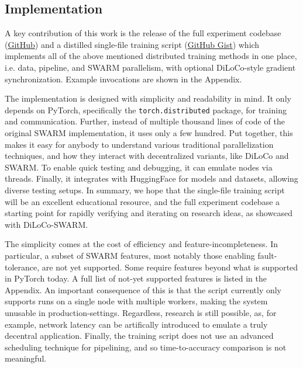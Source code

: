 \documentclass{article}
\newcommand{\github}{\href{https://github.com/mikasenghaas/diloco-swarm}{GitHub}}
\newcommand{\gist}{\href{https://gist.github.com/mikasenghaas/5fa1aa77ea69f187f531a5889983c249}{GitHub Gist}}
\begin{document}
\subsection{Implementation}


A key contribution of this work is the release of the full experiment codebase
(\github{}) and a distilled single-file training script (\gist{}) which
implements all of the above mentioned distributed training methods in one place,
i.e. data, pipeline, and SWARM parallelism, with optional DiLoCo-style gradient
synchronization. Example invocations are shown in the Appendix.

The implementation is designed with simplicity and readability in mind. It only
depends on PyTorch, specifically the \texttt{torch.distributed} package, for
training and communication. Further, instead of multiple thousand lines of code 
of the original SWARM implementation, it uses only a few hundred. Put together,
this makes it easy for anybody to understand various traditional parallelization
techniques, and how they interact with decentralized variants, like DiLoCo and
SWARM. To enable quick testing and debugging, it can emulate nodes via threads.
Finally, it integrates with HuggingFace for models and datasets, allowing
diverse testing setups. In summary, we hope that the single-file training script
will be an excellent educational resource, and the full experiment codebase a
starting point for rapidly verifying and iterating on research ideas, as
showcased with DiLoCo-SWARM.

The simplicity comes at the cost of efficiency and feature-incompleteness. In
particular, a subset of SWARM features, most notably those enabling
fault-tolerance, are not yet supported. Some require features beyond what is
supported in PyTorch today. A full list of not-yet supported features is listed
in the Appendix. An important consequence of this is that the script currently
only supports runs on a single node with multiple workers, making the system
unusable in production-settings. Regardless, research is still possible, as, for
example, network latency can be artifically introduced to emulate a truly
decentral application. Finally, the training script does not use an advanced
scheduling technique for pipelining, and so time-to-accuracy comparison is not
meaningful.
\end{document}
